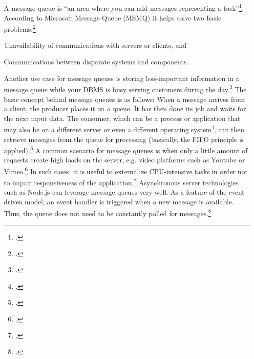 \newpage \begin{appendices} 
\appendixtocon %

\appendixpage %

\subsection*{\listappendixname}
\listofappendices

\newpage

\begin{subappendices}
\renewcommand{\setthesubsection}{\arabic{subsection}:}%

\label{appendix_kue}

A message queue is “an area where you can add messages representing a task”\footcite[][2]{McGlennon_2007}. According to Microsoft Message Queue (MSMQ) it helps solve two basic problems:\footcite[Cf.][1]{McGlennon_2007}
\begin{description}
  \item Unavailability of communications with servers or clients, and 
  \item Communications between disparate systems and components.
\end{description}
Another use case for message queues is storing less-important information in a message queue while your DBMS is busy serving customers during the day.\footcite[Cf.][449]{Thomson_2002}
The basic concept behind message queues is as follows: When a message arrives from a client, the producer places it on a queue. It has then done its job and waits for the next input data. The consumer, which can be a process or application that may also be on a different server or even a different operating system\footcite[Cf.][2]{McGlennon_2007}, can then retrieve messages from the queue for processing (basically, the FIFO principle is applied).\footcite[Cf.][450]{Thomson_2002}
A common scenario for message queues is when only a little amount of requests create high loads on the server, e.g. video platforms such as Youtube or Vimeo.\footcite[Cf.][247]{Roden_2012} In such cases, it is useful to externalize CPU-intensive tasks in order not to impair responsiveness of the application.\footcite[Cf.][247]{Roden_2012}
Asynchronous server technologies such as Node.js can leverage message queues very well. As a feature of the event-driven model, an event handler is triggered when a new message is available. Thus, the queue does not need to be constantly polled for messages.\footcite[Cf.][]{Knight_2011}


\end{subappendices}
\end{appendices}
